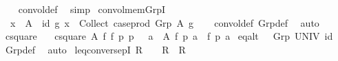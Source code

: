 \begin{isabellebody}
\ \ \isamarkupfalse%
\ convol{\isacharunderscore}{\kern0pt}def\ \isamarkupfalse%
\ simp%
\endisatagproof
{\isafoldproof}%
%
\isadelimproof
\isanewline
%
\endisadelimproof
\isanewline
{}\isamarkupfalse%
\ convol{\isacharunderscore}{\kern0pt}mem{\isacharunderscore}{\kern0pt}GrpI{\isacharcolon}{\kern0pt}\isanewline
\ \ {\isachardoublequoteopen}x\ {\isasymin}\ A\ {\isasymLongrightarrow}\ {\isasymlangle}id{\isacharcomma}{\kern0pt}\ g{\isasymrangle}\ x\ {\isasymin}\ {\isacharparenleft}{\kern0pt}Collect\ {\isacharparenleft}{\kern0pt}case{\isacharunderscore}{\kern0pt}prod\ {\isacharparenleft}{\kern0pt}Grp\ A\ g{\isacharparenright}{\kern0pt}{\isacharparenright}{\kern0pt}{\isacharparenright}{\kern0pt}{\isachardoublequoteclose}\isanewline
%
\isadelimproof
\ \ %
\endisadelimproof
%
\isatagproof
{}\isamarkupfalse%
\ convol{\isacharunderscore}{\kern0pt}def\ Grp{\isacharunderscore}{\kern0pt}def\ \isamarkupfalse%
\ auto%
\endisatagproof
{\isafoldproof}%
%
\isadelimproof
\isanewline
%
\endisadelimproof
\isanewline
{}\isamarkupfalse%
\ csquare\ \isanewline
\ \ {\isachardoublequoteopen}csquare\ A\ f{}\ f{}\ p{}\ p{}\ {\isasymlongleftrightarrow}\ {\isacharparenleft}{\kern0pt}{\isasymforall}\ a\ {\isasymin}\ A{\isachardot}{\kern0pt}\ f{}\ {\isacharparenleft}{\kern0pt}p{}\ a{\isacharparenright}{\kern0pt}\ {\isacharequal}{\kern0pt}\ f{}\ {\isacharparenleft}{\kern0pt}p{}\ a{\isacharparenright}{\kern0pt}{\isacharparenright}{\kern0pt}{\isachardoublequoteclose}\isanewline
\isanewline
{}\isamarkupfalse%
\ eq{\isacharunderscore}{\kern0pt}alt{\isacharcolon}{\kern0pt}\ {\isachardoublequoteopen}{\isacharparenleft}{\kern0pt}{\isacharequal}{\kern0pt}{\isacharparenright}{\kern0pt}\ {\isacharequal}{\kern0pt}\ Grp\ UNIV\ id{\isachardoublequoteclose}\isanewline
%
\isadelimproof
\ \ %
\endisadelimproof
%
\isatagproof
{}\isamarkupfalse%
\ Grp{\isacharunderscore}{\kern0pt}def\ \isamarkupfalse%
\ auto%
\endisatagproof
{\isafoldproof}%
%
\isadelimproof
\isanewline
%
\endisadelimproof
\isanewline
{}\isamarkupfalse%
\ leq{\isacharunderscore}{\kern0pt}conversepI{\isacharcolon}{\kern0pt}\ {\isachardoublequoteopen}R\ {\isacharequal}{\kern0pt}\ {\isacharparenleft}{\kern0pt}{\isacharequal}{\kern0pt}{\isacharparenright}{\kern0pt}\ {\isasymLongrightarrow}\ R\ {\isasymle}\ R{\isasyminverse}{\isasyminverse}{\isachardoublequoteclose}\isanewline

\end{isabellebody}
